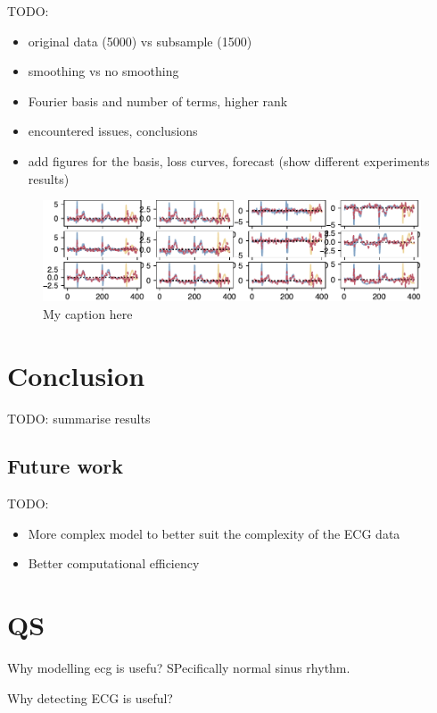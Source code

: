 \documentclass{mldsmsc}
\begin{document}
TODO:

\begin{itemize}
    \item original data (5000) vs subsample (1500)
    \item smoothing vs no smoothing
    \item Fourier basis and number of terms, higher rank
    \item encountered issues, conclusions
    \item add figures for the basis, loss curves, forecast (show different experiments results)
\end{itemize}

\begin{figure}[H]
\begin{center}
\includegraphics[scale=1]{images/periodic_fit_1500_6_6_150it.pdf}
\caption{My caption here}
\label{somelabelforreference}
\end{center}
\end{figure}

\chapter{Conclusion}

TODO: summarise results

\section{Future work}

TODO:
\begin{itemize}
    \item More complex model to better suit the complexity of the ECG data
    \item Better computational efficiency
\end{itemize}

\chapter{QS}

Why modelling ecg is usefu? SPecifically normal sinus rhythm.

Why detecting ECG is useful?

\clearpage
\renewcommand*{\thepage}{A\arabic{page}}

%
%




\end{document}
